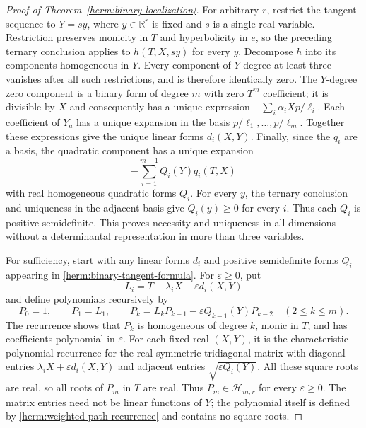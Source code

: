 \documentclass[reqno]{amsart}
\theoremstyle{definition}
\theoremstyle{remark}
\newcommand{\R}{\mathbb R}
\begin{document}
\begin{proof}[Proof of Theorem~\ref{herm:binary-localization}]
For arbitrary $r$, restrict the tangent sequence to $Y=sy$, where
$y\in\R^r$ is fixed and $s$ is a single real variable.  Restriction
preserves monicity in $T$ and hyperbolicity in $e$, so the preceding
ternary conclusion applies to $h(T,X,sy)$ for every $y$.
Decompose $h$ into its components homogeneous in $Y$.
Every component of $Y$-degree at least three vanishes after all such
restrictions, and is therefore identically zero.
The $Y$-degree zero component is a binary form of degree $m$ with
zero $T^m$ coefficient; it is divisible by $X$ and consequently has a
unique expression $-\sum_i\alpha_iX p/\ell_i$.
Each coefficient of $Y_a$ has a unique expansion in the basis
$p/\ell_1,\ldots,p/\ell_m$.  Together these expressions give the
unique linear forms $d_i(X,Y)$.
Finally, since the $q_i$ are a basis, the quadratic component has a
unique expansion
\[
 -\sum_{i=1}^{m-1}Q_i(Y)q_i(T,X)
\]
with real homogeneous quadratic forms $Q_i$.
For every $y$, the ternary conclusion and uniqueness in the adjacent
basis give $Q_i(y)\geq0$ for every $i$.  Thus each $Q_i$ is positive
semidefinite.  This proves necessity and uniqueness in all dimensions
without a determinantal representation in more than three variables.

For sufficiency, start with any linear forms $d_i$ and positive
semidefinite forms $Q_i$ appearing in
\eqref{herm:binary-tangent-formula}.  For $\varepsilon\geq0$, put
\[
 L_i=T-\lambda_iX-\varepsilon d_i(X,Y)
\]
and define polynomials recursively by
\begin{equation}\label{herm:weighted-path-recurrence}
 P_0=1,\qquad P_1=L_1,\qquad
 P_k=L_kP_{k-1}-\varepsilon Q_{k-1}(Y)P_{k-2}\quad(2\leq k\leq m).
\end{equation}
The recurrence shows that $P_k$ is homogeneous of degree $k$, monic
in $T$, and has coefficients polynomial in $\varepsilon$.
For each fixed real $(X,Y)$, it is the characteristic-polynomial
recurrence for the real symmetric tridiagonal matrix with diagonal
entries $\lambda_iX+\varepsilon d_i(X,Y)$ and adjacent entries
$\sqrt{\varepsilon Q_i(Y)}$.
All these square roots are real, so all roots of $P_m$ in $T$ are
real.  Thus $P_m\in\mathcal H_{m,r}$ for every $\varepsilon\geq0$.
The matrix entries need not be linear functions of $Y$; the polynomial
itself is defined by \eqref{herm:weighted-path-recurrence} and contains
no square roots.


\end{proof}
\end{document}
